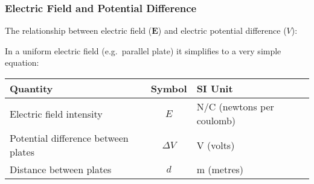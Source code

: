 \documentclass[12pt,aspectratio=169]{beamer}
\newcommand{\mb}[1]{\mathbf{#1}}
\begin{document}

\begin{frame}
  \frametitle{Electric Field and Potential Difference}
  
  The relationship between electric field ($\mb{E}$) and electric potential
  difference ($V$):
    
  \vspace{-.15in}{\Large
    \begin{displaymath}
      \mb{E}=-\frac{\partial V}{\partial r}
    \end{displaymath}
  }

  In a uniform electric field (e.g.\ parallel plate) it simplifies to a very
  simple equation:


  \vspace{-.1in}
  \begin{center}
    \begin{tabular}{l|c|l}
      \rowcolor{pink}
      \textbf{Quantity} & \textbf{Symbol} & \textbf{SI Unit} \\ \hline
      Electric field intensity & $E$ & \si{N/C} (newtons per coulomb) \\
      Potential difference between plates & $\Delta V$ & \si{V} (volts) \\
      Distance between plates       & $d$ & \si{m} (metres)\\
    \end{tabular}
  \end{center}
\end{frame}
\end{document}
